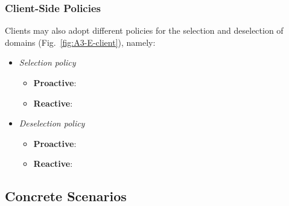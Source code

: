 \subsubsection{Client-Side Policies}

Clients may also adopt different policies for the selection and deselection of domains (Fig.~\ref{fig:A3-E-client}), namely:


\begin{itemize}
	
	\item \textit{Selection policy}
	
	\begin{itemize}
		
		\item \textbf{Proactive}: 
		
		\item \textbf{Reactive}: 
		
	\end{itemize}
	
	\item \textit{Deselection policy}
	
	\begin{itemize}
		
		\item \textbf{Proactive}: 
		
		\item \textbf{Reactive}: 
		
	\end{itemize}
\end{itemize}

\subsection{Concrete Scenarios}

